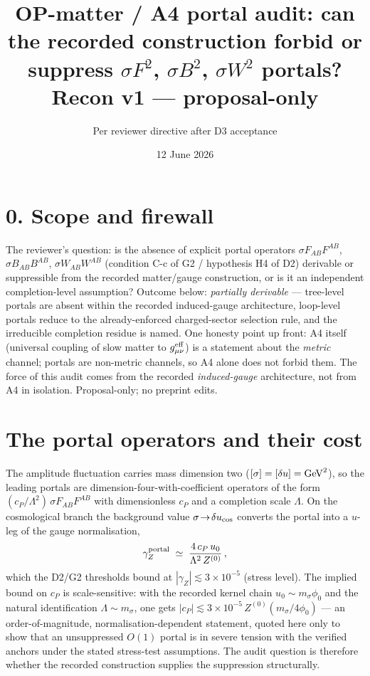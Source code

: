 \documentclass[11pt,a4paper]{article}
\title{\textbf{OP-matter / A4 portal audit: can the recorded construction
forbid or suppress $\sigma F^2$, $\sigma B^2$, $\sigma W^2$ portals?}\\\large
Recon v1 --- proposal-only}
\author{Per reviewer directive after D3 acceptance}
\date{12 June 2026}
\begin{document}
\maketitle

\section*{0. Scope and firewall}
The reviewer's question: is the absence of explicit portal operators
$\sigma F_{AB}F^{AB}$, $\sigma B_{AB}B^{AB}$, $\sigma W_{AB}W^{AB}$ (condition
C-c of G2 / hypothesis H4 of D2) derivable or suppressible from the recorded
matter/gauge construction, or is it an independent completion-level
assumption? Outcome below: \emph{partially derivable} --- tree-level portals
are absent within the recorded induced-gauge architecture, loop-level portals
reduce to the already-enforced charged-sector selection rule, and the
irreducible completion residue is named. One honesty point up front: A4
itself (universal coupling of slow matter to $g^{\rm eff}_{\mu\nu}$) is a
statement about the \emph{metric} channel; portals are non-metric channels, so
A4 alone does not forbid them. The force of this audit comes from the
recorded \emph{induced-gauge} architecture, not from A4 in isolation.
Proposal-only; no preprint edits.

\section{The portal operators and their cost}
The amplitude fluctuation carries mass dimension two ($[\sigma]=[\delta
u]={\rm GeV}^2$), so the leading portals are dimension-four-with-coefficient
operators of the form $(c_P/\Lambda^2)\,\sigma F_{AB}F^{AB}$ with
dimensionless $c_P$ and a completion scale $\Lambda$. On the cosmological
branch the background value $\sigma\!\to\!\delta u_{\rm cos}$ converts the
portal into a $u$-leg of the gauge normalisation,
\[
\gamma_Z^{\rm portal}\;\simeq\;\frac{4\,c_P\,u_0}{\Lambda^2\,Z^{(0)}}\,,
\]
which the D2/G2 thresholds bound at $|\gamma_Z|\lesssim3\times10^{-5}$
(stress level). The implied bound on $c_P$ is scale-sensitive: with the
recorded kernel chain $u_0\sim m_\sigma\phi_0$ and the natural identification
$\Lambda\sim m_\sigma$, one gets $|c_P|\lesssim 3\times10^{-5}\,
Z^{(0)}(m_\sigma/4\phi_0)$ --- an order-of-magnitude, normalisation-dependent
statement, quoted here only to show that an unsuppressed $O(1)$ portal is in
severe tension with the verified anchors under the stated stress-test
assumptions. The audit question is therefore whether the recorded
construction supplies the suppression structurally.
\end{document}
